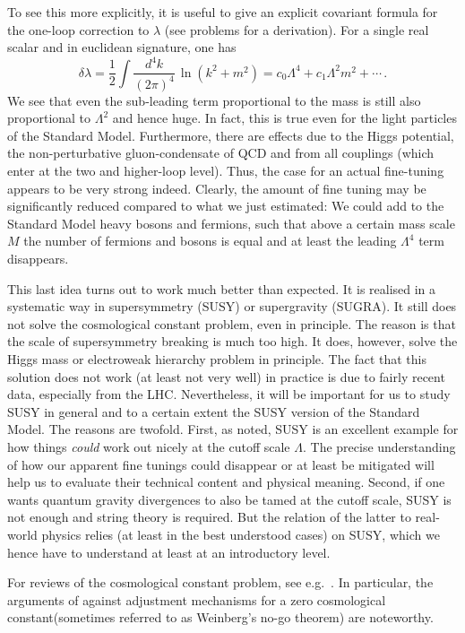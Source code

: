 \documentclass[12pt]{article}
\newcommand{\be}{\begin{equation}}
\newcommand{\ee}{\end{equation}}
\numberwithin{equation}{section}
\begin{document}
To see this more explicitly, it is useful to give an explicit covariant formula for the one-loop correction to $\lambda$ (see problems for a derivation). For a single real scalar and in euclidean signature, one has
\be
\delta\lambda=\frac{1}{2}\int \frac{d^4k}{(2\pi)^4}\,\ln(k^2+m^2)= c_0\Lambda^4+c_1\Lambda^2m^2+\cdots\,.
\ee
We see that even the sub-leading term proportional to the mass is still also proportional to $\Lambda^2$ and hence huge. In fact, this is true even for the light particles of the Standard Model. Furthermore, there are effects due to the Higgs potential, the non-perturbative gluon-condensate of QCD and from all couplings (which enter at the two and higher-loop level). Thus, the case for an actual fine-tuning appears to be very strong indeed. Clearly, the amount of fine tuning may be significantly reduced compared to what we just estimated: We could add to the Standard Model heavy bosons and fermions, such that above a certain mass scale $M$ the number of fermions and bosons is equal and at least the leading $\Lambda^4$ term disappears. 

This last idea turns out to work much better than expected. It is realised in a systematic way in supersymmetry (SUSY) or supergravity (SUGRA). It still does not solve the cosmological constant problem, even in principle. The reason is that the scale of supersymmetry breaking is much too high. It does, however, solve the Higgs mass or electroweak hierarchy problem in principle. The fact that this solution does not work (at least not very well) in practice is due to fairly recent data, especially from the LHC. Nevertheless, it will be important for us to study SUSY in general and to a certain extent the SUSY version of the Standard Model. The reasons are twofold. First, as noted, SUSY is an excellent example for how things {\it could} work out nicely at the cutoff scale $\Lambda$. The precise understanding of how our apparent fine tunings could disappear or at least be mitigated will help us to evaluate their technical content and physical meaning. Second, if one wants quantum gravity divergences to also be tamed at the cutoff scale, SUSY is not enough and string theory is required. But the relation of the latter to real-world physics relies (at least in the best understood cases) on SUSY, which we hence have to understand at least at an introductory level. 

For reviews of the cosmological constant problem, see e.g.~\cite{Weinberg:1988cp, Weinberg:2000yb, Padmanabhan:2002ji, Padmanabhan:2006ag}. In particular, the arguments of  \cite{Weinberg:1988cp} 
against adjustment mechanisms for a zero cosmological constant(sometimes referred to as Weinberg's no-go theorem) are noteworthy.
\end{document}
